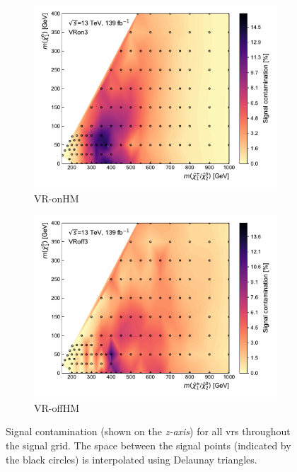 \begin{figure}[H]
\begin{subfigure}[b]{0.5\linewidth}
		\centering\includegraphics[width=1.0\textwidth]{signal_contamination/plot_VRon3}
		\caption{VR-onHM\label{fig:signal_contaminations_VRon3}}
	\end{subfigure}\hfill
	\begin{subfigure}[b]{0.5\linewidth}
		\centering\includegraphics[width=1.0\textwidth]{signal_contamination/plot_VRoff3}
		\caption{VR-offHM\label{fig:signal_contaminations_VRoff3}}
	\end{subfigure}\hfill

	\caption{Signal contamination (shown on the \textit{z-axis}) for all \glspl{vr} throughout the signal grid. The space between the signal points (indicated by the black circles) is interpolated using Delaunay triangles.}
	\label{fig:results_HF_scans}
\end{figure}
